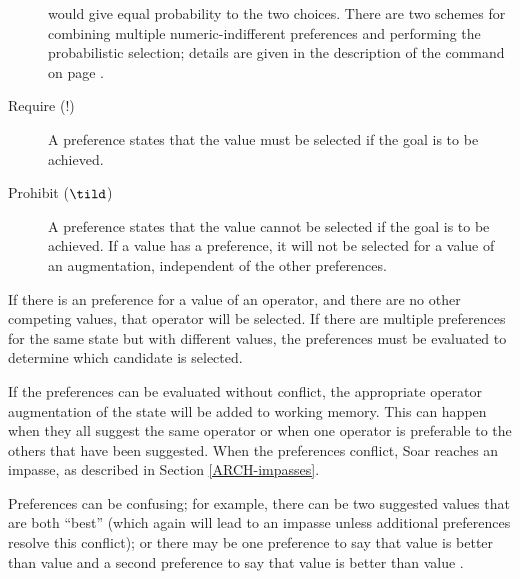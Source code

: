 \begin{description}
	would give equal probability to the two choices. There are two schemes for
	combining multiple numeric-indifferent preferences and performing the probabilistic
	selection; details are given in the description of the 
	command on page \pageref{numeric-indifferent-mode}.

\item [Require (!)] A  preference states that the value must be
        selected if the goal is to be achieved.\vspace{-8pt}

\item [Prohibit ($\tild$)] A  preference states that the value 
cannot
        be selected if the goal is to be achieved.  If a value has a
         preference, it will not be selected for a value of an
        augmentation, independent of the other preferences.\vspace{-8pt}
\end{description}


If there is an
\/ preference for a value of an operator, and there are no
other competing values, that operator will be selected.  If there are
multiple \/ preferences for the same state but with
different values, the preferences must be evaluated to determine which
candidate is selected.

If the preferences can be evaluated without conflict, the appropriate
operator augmentation of the state will be added to working
memory. This can happen when they all suggest the same operator or when
one operator is preferable to the others that have been suggested. When
the preferences conflict, Soar reaches an impasse, as described in
Section \ref{ARCH-impasses}.

Preferences can be confusing; for example, there can be two suggested
values that are both ``best'' (which again will lead to an impasse
unless additional preferences resolve this conflict); or there may be
one preference to say that value  is better than value 
and a second preference to say that value  is better than value
.



